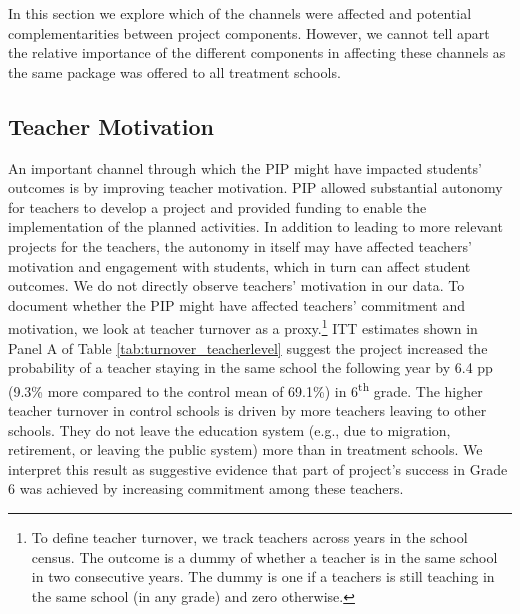 \documentclass[11pt,a4paper]{article}
\begin{document}
	In this section we explore which of the channels were affected and potential complementarities between project components. However, we cannot tell apart the relative importance of the different components in affecting these channels as the same package was offered to all treatment schools. 
	
	\subsection{Teacher Motivation} \label{sec:turnover}
	
	An important channel through which the PIP might have impacted students' outcomes is by improving teacher motivation. PIP allowed substantial autonomy for teachers to develop a project and provided funding to enable the implementation of the planned activities. In addition to leading to more relevant projects for the teachers, the autonomy in itself may have affected teachers' motivation and engagement with students, which in turn can affect student outcomes. We do not directly observe teachers' motivation in our data. To document whether the PIP might have affected teachers' commitment and motivation, we look at teacher turnover as a proxy.\footnote{To define teacher turnover, we track teachers across years in the school census. The outcome is a dummy of whether a teacher is in the same school in two consecutive years. The dummy is one if a teachers is still teaching in the same school (in any grade) and zero otherwise.} ITT estimates shown in Panel A of Table \ref{tab:turnover_teacherlevel} suggest the project increased the probability of a teacher staying in the same school the following year by 6.4 pp (9.3\% more compared to the control mean of 69.1\%) in 6\textsuperscript{th} grade. The higher teacher turnover in control schools is driven by more teachers leaving to other schools. They do not leave the education system (e.g., due to migration, retirement, or leaving the public system) more than in treatment schools. We interpret this result as suggestive evidence that part of project's success in Grade 6 was achieved by increasing commitment among these teachers. 
	
\end{document}
